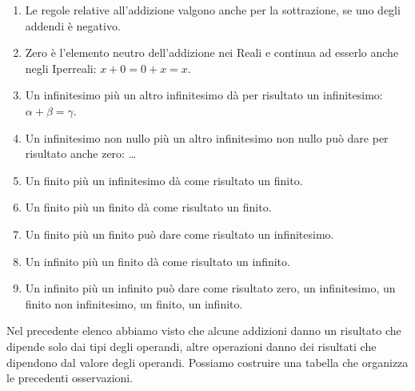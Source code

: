 \begin{enumerate} [noitemsep]
 \item Le regole relative all'addizione valgono anche per la sottrazione, se 
uno degli addendi è negativo. 
 \item Zero è l'elemento neutro dell'addizione nei Reali e continua ad esserlo 
anche negli Iperreali: $x+0=0+x=x$.
 \item Un infinitesimo più un altro infinitesimo dà per risultato un 
infinitesimo: $\alpha+\beta=\gamma$.
 \item Un infinitesimo non nullo più un altro infinitesimo non nullo può dare 
per risultato anche zero: \dots
 \item Un finito più un infinitesimo dà come risultato un finito.
 \item Un finito più un finito dà come risultato un finito.
 \item Un finito più un finito può dare come risultato un infinitesimo.
 \item Un infinito più un finito dà come risultato un infinito.
 \item Un infinito più un infinito può dare come risultato zero, un 
infinitesimo, un finito non infinitesimo, un finito, un infinito.
\end{enumerate}

Nel precedente elenco abbiamo visto che alcune addizioni danno un risultato 
che dipende solo dai tipi degli operandi, altre operazioni danno dei risultati 
che dipendono dal valore degli operandi. Possiamo costruire una tabella che 
organizza le precedenti osservazioni.

\begin{center}
\renewcommand{\arraystretch}{.0}
\end{center}

